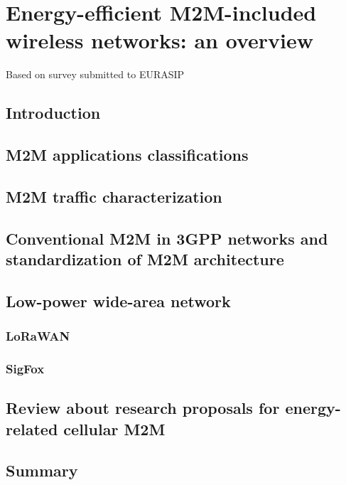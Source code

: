 \chapter{Energy-efficient M2M-included wireless networks: an overview}

\ifpdf
    \graphicspath{{Chapter2/Figs/Raster/}{Chapter2/Figs/PDF/}{Chapter2/Figs/}}
\else
    \graphicspath{{Chapter2/Figs/Vector/}{Chapter2/Figs/}}
\fi

Based on survey submitted to EURASIP
\section{Introduction}

\section{M2M applications classifications}

\section{M2M traffic characterization}


\section{Conventional M2M in 3GPP networks and standardization of M2M architecture}


\section{Low-power wide-area network}
\subsection{LoRaWAN}
\subsection{SigFox}

\section{Review about research proposals for energy-related cellular M2M}
\section{Summary}
